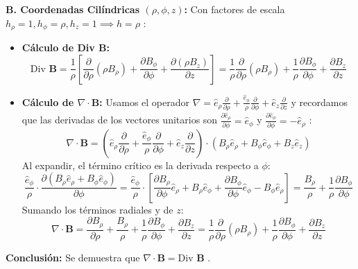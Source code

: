 \documentclass[a4paper]{article}
\begin{document}
\textbf{B. Coordenadas Cilíndricas $(\rho, \phi, z)$:}
Con factores de escala $h_\rho = 1, h_\phi = \rho, h_z = 1 \implies h = \rho$ \cite{73, 90}:
\begin{itemize}
    \item \textbf{Cálculo de Div $\mathbf{B}$:}
    \begin{equation}
        \text{Div }\mathbf{B} = \frac{1}{\rho} \left[ \frac{\partial}{\partial \rho}(\rho B_\rho) + \frac{\partial B_\phi}{\partial \phi} + \frac{\partial (\rho B_z)}{\partial z} \right] = \frac{1}{\rho} \frac{\partial}{\partial \rho}(\rho B_\rho) + \frac{1}{\rho} \frac{\partial B_\phi}{\partial \phi} + \frac{\partial B_z}{\partial z}
    \end{equation}
    \item \textbf{Cálculo de $\nabla \cdot \mathbf{B}$:}
    Usamos el operador $\nabla = \hat{e}_\rho \frac{\partial}{\partial \rho} + \frac{\hat{e}_\phi}{\rho} \frac{\partial}{\partial \phi} + \hat{e}_z \frac{\partial}{\partial z}$ y recordamos que las derivadas de los vectores unitarios son $\frac{\partial \hat{e}_\rho}{\partial \phi} = \hat{e}_\phi$ y $\frac{\partial \hat{e}_\phi}{\partial \phi} = -\hat{e}_\rho$ \cite{50, 82, 90}:
    \begin{equation}
        \nabla \cdot \mathbf{B} = \left( \hat{e}_\rho \frac{\partial}{\partial \rho} + \frac{\hat{e}_\phi}{\rho} \frac{\partial}{\partial \phi} + \hat{e}_z \frac{\partial}{\partial z} \right) \cdot (B_\rho \hat{e}_\rho + B_\phi \hat{e}_\phi + B_z \hat{e}_z)
    \end{equation}
    Al expandir, el término crítico es la derivada respecto a $\phi$:
    \begin{equation}
        \frac{\hat{e}_\phi}{\rho} \cdot \frac{\partial (B_\rho \hat{e}_\rho + B_\phi \hat{e}_\phi)}{\partial \phi} = \frac{\hat{e}_\phi}{\rho} \cdot \left[ \frac{\partial B_\rho}{\partial \phi} \hat{e}_\rho + B_\rho \hat{e}_\phi + \frac{\partial B_\phi}{\partial \phi} \hat{e}_\phi - B_\phi \hat{e}_\rho \right] = \frac{B_\rho}{\rho} + \frac{1}{\rho} \frac{\partial B_\phi}{\partial \phi}
    \end{equation}
    Sumando los términos radiales y de $z$:
    \begin{equation}
        \nabla \cdot \mathbf{B} = \frac{\partial B_\rho}{\partial \rho} + \frac{B_\rho}{\rho} + \frac{1}{\rho} \frac{\partial B_\phi}{\partial \phi} + \frac{\partial B_z}{\partial z} = \frac{1}{\rho} \frac{\partial}{\partial \rho}(\rho B_\rho) + \frac{1}{\rho} \frac{\partial B_\phi}{\partial \phi} + \frac{\partial B_z}{\partial z}
    \end{equation}
\end{itemize}
\textbf{Conclusión:} Se demuestra que $\nabla \cdot \mathbf{B} = \text{Div }\mathbf{B}$ \cite{90}.
\end{document}
